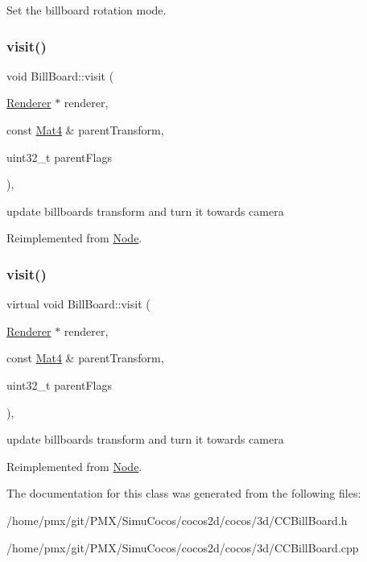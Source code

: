 Set the billboard rotation mode. \mbox{\label{classBillBoard_a2caec4c849717693e62be305a0ca789c}} 
\subsubsection{\texorpdfstring{visit()}{visit()}\hspace{0.1cm}{\footnotesize\ttfamily [1/2]}}
{\footnotesize\ttfamily void Bill\+Board\+::visit (\begin{DoxyParamCaption}\item[{\hyperlink{classRenderer}{Renderer} $\ast$}]{renderer,  }\item[{const \hyperlink{classMat4}{Mat4} \&}]{parent\+Transform,  }\item[{uint32\+\_\+t}]{parent\+Flags }\end{DoxyParamCaption})\hspace{0.3cm}{\ttfamily [override]}, {\ttfamily [virtual]}}

update billboard\textquotesingle{}s transform and turn it towards camera 

Reimplemented from \hyperlink{classNode_a7d794a5e30745611ec33881a625edf26}{Node}.

\mbox{\label{classBillBoard_ae51a82da848a1a3c70cf109cdb1b79ba}} 
\subsubsection{\texorpdfstring{visit()}{visit()}\hspace{0.1cm}{\footnotesize\ttfamily [2/2]}}
{\footnotesize\ttfamily virtual void Bill\+Board\+::visit (\begin{DoxyParamCaption}\item[{\hyperlink{classRenderer}{Renderer} $\ast$}]{renderer,  }\item[{const \hyperlink{classMat4}{Mat4} \&}]{parent\+Transform,  }\item[{uint32\+\_\+t}]{parent\+Flags }\end{DoxyParamCaption})\hspace{0.3cm}{\ttfamily [override]}, {\ttfamily [virtual]}}

update billboard\textquotesingle{}s transform and turn it towards camera 

Reimplemented from \hyperlink{classNode_a7d794a5e30745611ec33881a625edf26}{Node}.



The documentation for this class was generated from the following files\+:\begin{DoxyCompactItemize}
\item 
/home/pmx/git/\+P\+M\+X/\+Simu\+Cocos/cocos2d/cocos/3d/C\+C\+Bill\+Board.\+h\item 
/home/pmx/git/\+P\+M\+X/\+Simu\+Cocos/cocos2d/cocos/3d/C\+C\+Bill\+Board.\+cpp\end{DoxyCompactItemize}
